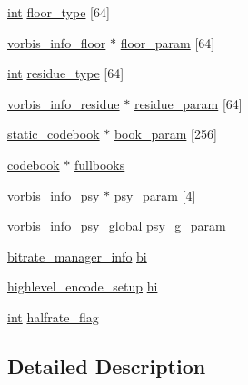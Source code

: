\begin{DoxyCompactItemize}
\item 
\hyperlink{xmltok_8h_a5a0d4a5641ce434f1d23533f2b2e6653}{int} \hyperlink{structcodec__setup__info_a21afed51cb5ad1c5c48d49e9ed4b3ed4}{floor\+\_\+type} \mbox{[}64\mbox{]}
\item 
\hyperlink{codec__internal_8h_a8b87cd2e3f6cc302c907d0f741db62fd}{vorbis\+\_\+info\+\_\+floor} $\ast$ \hyperlink{structcodec__setup__info_aab56a3fb5d09bec9bd5bad31e2416492}{floor\+\_\+param} \mbox{[}64\mbox{]}
\item 
\hyperlink{xmltok_8h_a5a0d4a5641ce434f1d23533f2b2e6653}{int} \hyperlink{structcodec__setup__info_a47b8090556fae1648803a10d58717235}{residue\+\_\+type} \mbox{[}64\mbox{]}
\item 
\hyperlink{codec__internal_8h_a8b8240a541e288532d710b22512b4524}{vorbis\+\_\+info\+\_\+residue} $\ast$ \hyperlink{structcodec__setup__info_a1f815302d7363e9ac93f84fb8cd186c4}{residue\+\_\+param} \mbox{[}64\mbox{]}
\item 
\hyperlink{structstatic__codebook}{static\+\_\+codebook} $\ast$ \hyperlink{structcodec__setup__info_abb1b7e743fc36f4b0482c7c6b944cdc2}{book\+\_\+param} \mbox{[}256\mbox{]}
\item 
\hyperlink{structcodebook}{codebook} $\ast$ \hyperlink{structcodec__setup__info_a551b0e1b956b797aab890e6ab91f9ec1}{fullbooks}
\item 
\hyperlink{structvorbis__info__psy}{vorbis\+\_\+info\+\_\+psy} $\ast$ \hyperlink{structcodec__setup__info_ac035c2848c4b55ca75d42635dfad1be3}{psy\+\_\+param} \mbox{[}4\mbox{]}
\item 
\hyperlink{structvorbis__info__psy__global}{vorbis\+\_\+info\+\_\+psy\+\_\+global} \hyperlink{structcodec__setup__info_a73f2d587bb82d9c1e0c79a8d809c4e37}{psy\+\_\+g\+\_\+param}
\item 
\hyperlink{structbitrate__manager__info}{bitrate\+\_\+manager\+\_\+info} \hyperlink{structcodec__setup__info_ac8f01db327dffe4b49225debaf14e253}{bi}
\item 
\hyperlink{structhighlevel__encode__setup}{highlevel\+\_\+encode\+\_\+setup} \hyperlink{structcodec__setup__info_aedeb89fe833e4b8de6eee1248cef3903}{hi}
\item 
\hyperlink{xmltok_8h_a5a0d4a5641ce434f1d23533f2b2e6653}{int} \hyperlink{structcodec__setup__info_a88a2b7fda297b325bcdfb24ba9c81b49}{halfrate\+\_\+flag}
\end{DoxyCompactItemize}


\subsection{Detailed Description}


